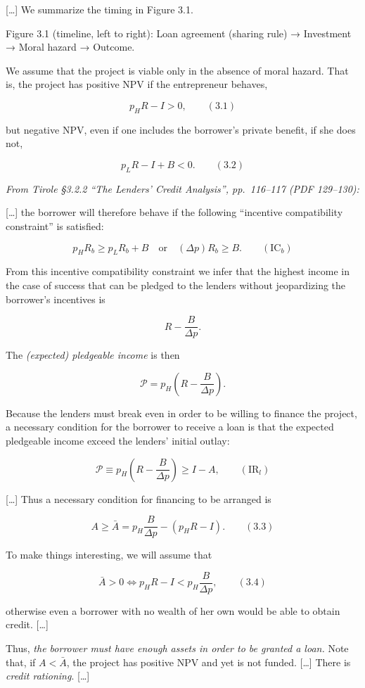 \documentclass[11pt,a4paper]{article}
\begin{document}
{[}\ldots{]} We summarize the timing in Figure 3.1.

Figure 3.1 (timeline, left to right): Loan agreement (sharing rule) → Investment → Moral hazard →
Outcome.

We assume that the project is viable only in the absence of moral hazard. That is, the project has
positive NPV if the entrepreneur behaves,

\[p_H R - I > 0, \qquad (3.1)\]

but negative NPV, even if one includes the borrower's private benefit, if she does not,

\[p_L R - I + B < 0. \qquad (3.2)\]

\emph{From Tirole §3.2.2 ``The Lenders' Credit Analysis'', pp.~116--117 (PDF 129--130):}

{[}\ldots{]} the borrower will therefore behave if the following ``incentive compatibility
constraint'' is satisfied:

\[p_H R_b \geqslant p_L R_b + B \quad \text{or} \quad (\Delta p) R_b \geqslant B. \qquad (\text{IC}_b)\]

From this incentive compatibility constraint we infer that the highest income in the case of success
that can be pledged to the lenders without jeopardizing the borrower's incentives is

\[R - \frac{B}{\Delta p}.\]

The \emph{(expected) pledgeable income} is then

\[\mathcal{P} = p_H\left(R - \frac{B}{\Delta p}\right).\]

Because the lenders must break even in order to be willing to finance the project, a necessary
condition for the borrower to receive a loan is that the expected pledgeable income exceed the
lenders' initial outlay:

\[\mathcal{P} \equiv p_H\left(R - \frac{B}{\Delta p}\right) \geqslant I - A, \qquad (\text{IR}_l)\]

{[}\ldots{]} Thus a necessary condition for financing to be arranged is

\[A \geqslant \bar A = p_H \frac{B}{\Delta p} - (p_H R - I). \qquad (3.3)\]

To make things interesting, we will assume that

\[\bar A > 0 \iff p_H R - I < p_H \frac{B}{\Delta p}, \qquad (3.4)\]

otherwise even a borrower with no wealth of her own would be able to obtain credit. {[}\ldots{]}

Thus, \emph{the borrower must have enough assets in order to be granted a loan.} Note that, if
\(A < \bar A\), the project has positive NPV and yet is not funded. {[}\ldots{]} There is
\emph{credit rationing}. {[}\ldots{]}
\end{document}
